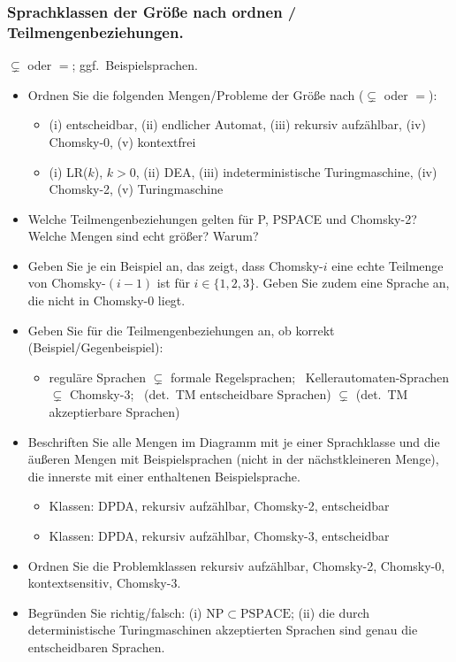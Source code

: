 \subsubsection{Sprachklassen der Größe nach ordnen / Teilmengenbeziehungen.}
$\subsetneq$ oder $=$; ggf.\ Beispielsprachen.
\begin{itemize}
    \item Ordnen Sie die folgenden Mengen/Probleme der Größe nach ($\subsetneq$ oder $=$):
    \begin{itemize}
        \item (i) entscheidbar, (ii) endlicher Automat, (iii) rekursiv aufzählbar, (iv) Chomsky-0, (v) kontextfrei 
        \item  (i) LR($k$), $k>0$, (ii) DEA, (iii) indeterministische Turingmaschine, (iv) Chomsky-2, (v)
        Turingmaschine 
    \end{itemize}
    \item Welche Teilmengenbeziehungen gelten für P, PSPACE und Chomsky-2? Welche Mengen sind echt größer? Warum?  \quad {}
    \item Geben Sie je ein Beispiel an, das zeigt, dass Chomsky-$i$ eine echte Teilmenge von Chomsky-$(i-1)$
    ist für $i\in\{1,2,3\}$. Geben Sie zudem eine Sprache an, die nicht in Chomsky-0 liegt. 
    \item Geben Sie für die Teilmengenbeziehungen an, ob korrekt (Beispiel/Gegenbeispiel):
    \begin{itemize}
        \item reguläre Sprachen $\subsetneq$ formale Regelsprachen; \ Kellerautomaten-Sprachen $\subsetneq$ Chomsky-3;
        \ (det.\ TM entscheidbare Sprachen) $\subsetneq$ (det.\ TM akzeptierbare Sprachen) 
    \end{itemize}
    \item Beschriften Sie alle Mengen im Diagramm mit je einer Sprachklasse und die äußeren Mengen mit
    Beispielsprachen (nicht in der nächstkleineren Menge), die innerste mit einer enthaltenen Beispielsprache.
    \begin{itemize}
        \item Klassen: DPDA, rekursiv aufzählbar, Chomsky-2, entscheidbar 
        \item  Klassen: DPDA, rekursiv aufzählbar, Chomsky-3, entscheidbar 
    \end{itemize}
    \item Ordnen Sie die Problemklassen rekursiv aufzählbar, Chomsky-2, Chomsky-0, kontextsensitiv, Chomsky-3. 
    \item Begründen Sie richtig/falsch: (i) $\mathrm{NP}\subset\mathrm{PSPACE}$; 
    (ii) die durch deterministische Turingmaschinen akzeptierten Sprachen sind genau die entscheidbaren Sprachen. 
\end{itemize}

